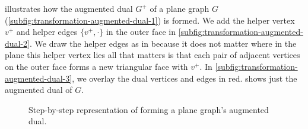  illustrates how the augmented dual $G^+$ of a plane graph $G$ (\cref{subfig:transformation-augmented-dual-1}) is formed.
We add the helper vertex $v^+$ and helper edges $\{v^+,\cdot\}$ in the outer face in \cref{subfig:transformation-augmented-dual-2}.
We draw the helper edges as in \cite{wagner2016algorithmen} because it does not matter where in the plane this helper vertex lies \emdash{} all that matters is that each pair of adjacent vertices on the outer face forms a new triangular face with $v^+$.
In \cref{subfig:transformation-augmented-dual-3}, we overlay the dual vertices and edges in red.
 shows just the augmented dual of $G$.
%
\begin{figure}[H]
	\centering
	\quad
	\quad
	\quad
	\caption{Step-by-step representation of forming a plane graph's augmented dual.}
	\label{fig:transformation-augmented-dual}
\end{figure}

